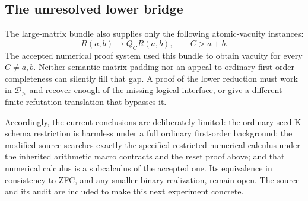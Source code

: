 \subsection{The unresolved lower bridge}

The large-matrix bundle also supplies only the following atomic-vacuity
instances:
\[
          R(a,b)\longrightarrow Q_C R(a,b),\qquad C>a+b.
\]
The accepted numerical proof system used this bundle to obtain vacuity
for every \(C\ne a,b\). Neither semantic matrix padding nor an appeal
to ordinary first-order completeness can silently fill that gap.
A proof of the lower reduction must work in \(\mathcal D_{>}\) and
recover enough of the missing logical interface, or give a different
finite-refutation translation that bypasses it.

Accordingly, the current conclusions are deliberately limited: the
ordinary seed-K schema restriction is harmless under a full ordinary
first-order background; the modified source searches exactly the
specified restricted numerical calculus under the inherited arithmetic
macro contracts and the reset proof above; and that numerical calculus
is a subcalculus of the accepted one. Its equivalence in consistency to
ZFC, and any smaller binary realization, remain open. The source and
its audit are included to make this next experiment concrete.

